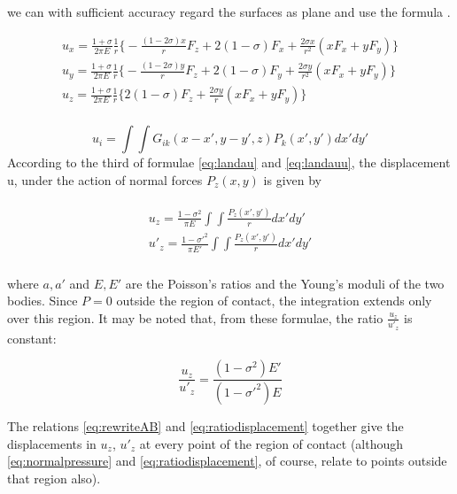  we can with sufficient accuracy regard the surfaces as plane and use the formula \citep{landau}.
 
\begin{equation}
\begin{split}
u_{x} = \frac{1+\sigma}{2 \pi E} \frac{1}{r} \Big\{ -\frac{(1-2\sigma)x}{r}F_{z} + 2(1-\sigma)F_{x} + \frac{2\sigma x}{r^{2}} (xF_{x} + yF_{y}) \Big\} \\
u_{y} = \frac{1+\sigma}{2 \pi E} \frac{1}{r} \Big\{ -\frac{(1-2\sigma)y}{r}F_{z} + 2(1-\sigma)F_{y} + \frac{2\sigma y}{r^{2}} (xF_{x} + yF_{y}) \Big\} \\
u_{z} = \frac{1+\sigma}{2 \pi E} \frac{1}{r} \Big\{ 2(1-\sigma)F_{z} + \frac{2\sigma y}{r} (xF_{x} + yF_{y}) \Big\} \\
\end{split}
\label{eq:landau}
\end{equation}


\begin{equation}
u_{i} = \int\int G_{ik} (x - x', y-y', z) P_{k}(x',y') dx' dy'
\label{eq:landauu}
\end{equation}
According to the third of formulae \ref{eq:landau} and \ref{eq:landauu}, the
displacement u, under the action of normal forces $P_{z}(x, y)$ is given by

\begin{align}
\begin{split}
u_{z} = \frac{1-\sigma^{2}}{\pi E}\int\int\frac{P_{z}(x',y')}{r}dx'dy' \\
u'_{z} = \frac{1-\sigma'^{2}}{\pi E'}\int\int\frac{P_{z}(x',y')}{r}dx'dy' \\
\end{split}
\label{eq:normalpressure}
\end{align}

where $a, a'$ and $E, E'$ are the Poisson’s ratios and the Young’s moduli of the two bodies. Since $P = 0$ outside the region of contact, the integration extends only over this region. It may be noted that, from these formulae, the ratio $\frac{u_{z}}{u'_{z}}$ is constant:

\begin{equation}
\frac{u_{z}}{u'_{z}} = \frac{(1-\sigma^{2})E'}{(1-\sigma'^{2})E}
\label{eq:ratiodisplacement}
\end{equation}

The relations \ref{eq:rewriteAB} and \ref{eq:ratiodisplacement} together give the displacements in $u_{z}$, $u'_{z}$ at every point of the region of contact (although \ref{eq:normalpressure} and \ref{eq:ratiodisplacement}, of course, relate to
points outside that region also).

